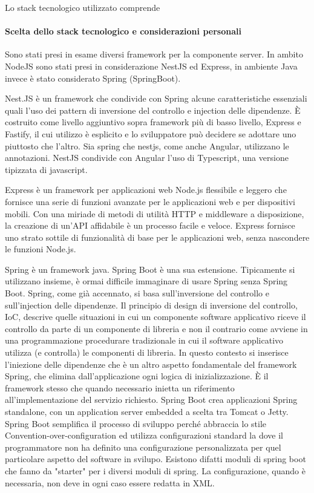 \documentclass[a4paper,11pt]{article}
\begin{document}
Lo stack tecnologico utilizzato comprende


\paragraph{Scelta dello stack tecnologico e considerazioni personali }

Sono stati presi in esame diversi framework per la componente server. In ambito NodeJS sono stati presi in considerazione NestJS ed Express, in ambiente Java invece è stato considerato Spring (SpringBoot).

Nest.JS è un framework che condivide con Spring alcune caratteristiche essenziali quali l'uso dei pattern di inversione del controllo e injection delle dipendenze. È costruito come livello aggiuntivo sopra framework più di basso livello, Express e Fastify, il cui utilizzo è esplicito e lo sviluppatore può decidere se adottare uno piuttosto che l'altro. Sia spring che nestjs, come anche Angular, utilizzano le annotazioni. NestJS condivide con Angular l'uso di Typescript, una versione tipizzata di javascript.

Express è un framework per applicazioni web Node.js flessibile e leggero che fornisce una serie di funzioni avanzate per le applicazioni web e per dispositivi mobili. Con una miriade di metodi di utilità HTTP e middleware a disposizione, la creazione di un'API affidabile è un processo facile e veloce. Express fornisce uno strato sottile di funzionalità di base per le applicazioni web, senza nascondere le funzioni Node.js. \cite{expressjsExpressFramework}

Spring è un framework java. Spring Boot è una sua estensione. Tipicamente si utilizzano insieme, è ormai difficile immaginare di usare Spring senza Spring Boot. Spring, come già accennato, si basa sull'inversione del controllo e sull'injection delle dipendenze. Il principio di design di inversione del controllo, IoC, descrive quelle situazioni in cui un componente software applicativo riceve il controllo da parte di un componente di libreria e non il contrario come avviene in una programmazione procedurare tradizionale in cui il software applicativo utilizza (e controlla) le componenti di libreria. In questo contesto si inserisce l'iniezione delle dipendenze che è un altro aspetto fondamentale del framework Spring, che elimina dall'applicazione ogni logica di inizializzazione. È il framework stesso che quando necessario inietta un riferimento all'implementazione del servizio richiesto. \cite{wikipediaInversioneControllo} Spring Boot crea applicazioni Spring standalone, con un application server embedded a scelta tra Tomcat o Jetty. Spring Boot semplifica il processo di sviluppo perché abbraccia lo stile Convention-over-configuration ed utilizza configurazioni standard la dove il programmatore non ha definito una configurazione personalizzata per quel particolare aspetto del software in svilupo. Esistono difatti moduli di spring boot che fanno da "starter" per i diversi moduli di spring. La configurazione, quando è necessaria, non deve in ogni caso essere redatta in XML. \cite{wikipediaSpringBoot}
\end{document}
